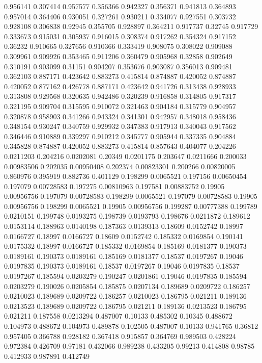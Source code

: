 0.956141 0.307414
0.957577 0.356366
0.942327 0.356371
0.941813 0.364893
0.957014 0.364406
0.930051 0.327261
0.930211 0.334077
0.927551 0.303732
0.928108 0.306838
0.92945 0.355705
0.928897 0.364211
0.917737 0.32745
0.917729 0.333673
0.915031 0.305937
0.916015 0.308374
0.917262 0.354324
0.917152 0.36232
0.910665 0.327656
0.910366 0.333419
0.908075 0.308022
0.909088 0.309961
0.909926 0.353465
0.911206 0.360479
0.905968 0.32858
0.902649 0.310191
0.903099 0.31151
0.904207 0.353676
0.903087 0.356013
0.909481 0.362103
0.887171 0.423642
0.883273 0.415814
0.874887 0.420052
0.874887 0.420052
0.877162 0.426778
0.887171 0.423642
0.941726 0.313438
0.928933 0.313808
0.929568 0.320635
0.942486 0.320239
0.916858 0.314805
0.917317 0.321195
0.909704 0.315595
0.910072 0.321463
0.904184 0.315779
0.904957 0.320878
0.958903 0.341266
0.943324 0.341301
0.942957 0.348018
0.958436 0.348154
0.930247 0.340759
0.929932 0.347383
0.917913 0.340043
0.917562 0.346446
0.910889 0.339297
0.910212 0.345777
0.905944 0.337335
0.904884 0.345828
0.874887 0.420052
0.883273 0.415814
0.857643 0.404077
0.204226 0.0211203
0.204216 0.0202081
0.20349 0.0201175
0.203647 0.0211666
0.200033 0.00983506
0.202035 0.00950408
0.202374 0.00823301
0.200266 0.00820005
0.860976 0.395919
0.882736 0.401129
0.198299 0.0065521
0.197156 0.00650454
0.197079 0.00728583
0.197275 0.00810963
0.197581 0.00883752
0.19905 0.00956756
0.197079 0.00728583
0.198299 0.0065521
0.197079 0.00728583
0.19905 0.00956756
0.198299 0.0065521
0.19905 0.00956756
0.199287 0.00777388
0.199789 0.0210151
0.199748 0.0193275
0.198739 0.0193793
0.198676 0.0211872
0.189612 0.0153114
0.188963 0.0140198
0.187363 0.0139313
0.18609 0.0152742
0.18997 0.0166727
0.18997 0.0166727
0.18609 0.0152742
0.185332 0.0169854
0.190141 0.0175332
0.18997 0.0166727
0.185332 0.0169854
0.185169 0.0181377
0.190373 0.0189161
0.190373 0.0189161
0.185169 0.0181377
0.18537 0.0197267
0.19046 0.0197835
0.190373 0.0189161
0.18537 0.0197267
0.19046 0.0197835
0.18537 0.0197267
0.185594 0.0203279
0.190247 0.0201861
0.19046 0.0197835
0.185594 0.0203279
0.190026 0.0205854
0.185875 0.0207134
0.189689 0.0209722
0.186257 0.0210023
0.189689 0.0209722
0.186257 0.0210023
0.186795 0.021211
0.189136 0.0213523
0.189689 0.0209722
0.186795 0.021211
0.189136 0.0213523
0.186795 0.021211
0.187558 0.0213294
0.487007 0.10133
0.485302 0.10345
0.488672 0.104973
0.488672 0.104973
0.489878 0.102505
0.487007 0.10133
0.941765 0.36812
0.957405 0.366788
0.928182 0.367418
0.915857 0.364769
0.989503 0.428224
0.972384 0.426709
0.97181 0.432066
0.989238 0.433205
0.99213 0.414808
0.98785 0.412933
0.987891 0.412749

